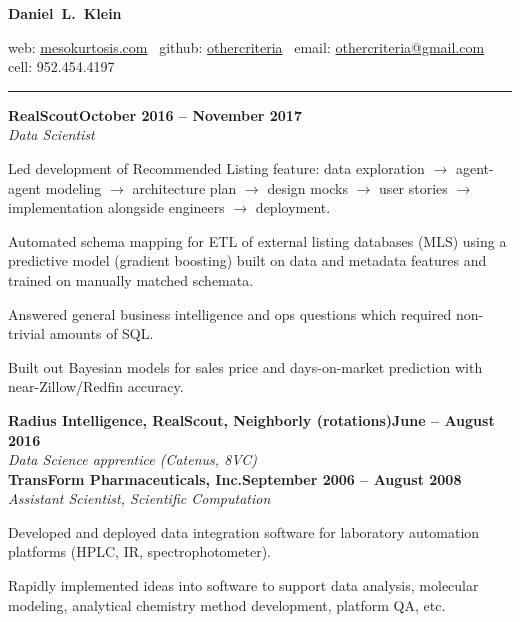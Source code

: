 \documentclass{article}
\newcommand{\ressection}[1]{\noindent{\large\textbf{#1}}\vspace{2pt}\hrule\vspace{4pt}}
\newcommand{\leftandright}[2]{\noindent\textbf{#1}\hfill\textbf{#2}}
\begin{document}
\sffamily

\begin{center}
\textbf{\huge{Daniel~L.~Klein}}

web: \href{http://mesokurtosis.com}{mesokurtosis.com}
\textbullet\, github: \href{https://github.com/othercriteria}{othercriteria}
\textbullet\, email: \href{mailto:othercriteria@gmail.com}{othercriteria@gmail.com}
\textbullet\, cell: 952.454.4197
\end{center}

\ressection{Work experience}

\leftandright{RealScout}{October 2016 -- November 2017} \\ \textit{Data Scientist}

\begin{itemize*}
\item Led development of Recommended Listing feature: data exploration
  $\rightarrow$ agent-agent modeling $\rightarrow$ architecture plan
  $\rightarrow$ design mocks $\rightarrow$ user stories $\rightarrow$
  implementation alongside engineers $\rightarrow$ deployment.
\item Automated schema mapping for ETL of external listing databases
  (MLS) using a predictive model (gradient boosting) built on data
  and metadata features and trained on manually matched schemata.
\item Answered general business intelligence and ops questions which
  required non-trivial amounts of SQL.
\item Built out Bayesian models for sales price and days-on-market
  prediction with near-Zillow/Redfin accuracy.
\end{itemize*}

\leftandright{Radius Intelligence, RealScout, Neighborly (rotations)}{June -- August 2016} \\
\textit{Data Science apprentice (Catenus, 8VC)} \\

\leftandright{TransForm Pharmaceuticals, Inc.}{September 2006 -- August 2008} \\
\textit{Assistant Scientist, Scientific Computation}

\begin{itemize*}
\item Developed and deployed data integration software for laboratory
  automation platforms (HPLC, IR, spectrophotometer).
\item Rapidly implemented ideas into software to support data
  analysis, molecular modeling, analytical chemistry method
  development, platform QA, etc.
\end{itemize*}
\end{document}

